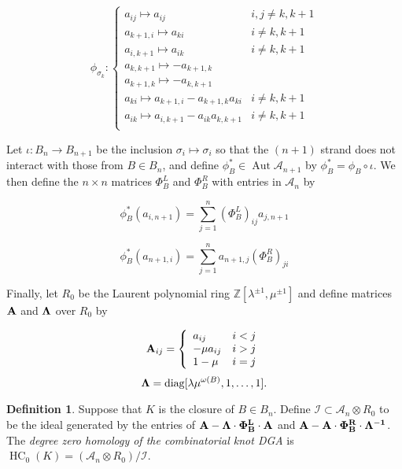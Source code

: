 \documentclass{amsart}[11pt,fullpage]
\def\Z{{\mathbb Z}}
\def\A{{\mathcal A}}
\def\s{{\sigma}}
\newcommand\Aut{\operatorname{Aut}}
\newcommand\diag{\operatorname{diag}}
\theoremstyle{definition}
\newtheorem{defn}[thm]{Definition}
\begin{document}
  \begin{equation}
  \phi_{\s_k}\colon
  \left\{
       \begin{array}{lr}
         a_{ij}\mapsto a_{ij} & i,j\ne k,k+1\\
         a_{k+1,i}\mapsto a_{ki} & i\ne k,k+1\\
         a_{i,k+1}\mapsto a_{ik} & i\ne k,k+1\\
         a_{k,k+1}\mapsto -a_{k+1,k} & \\
         a_{k+1,k}\mapsto -a_{k,k+1} & \\
         a_{ki}\mapsto a_{k+1,i} - a_{k+1,k}a_{ki} & i\ne k,k+1\\
         a_{ik}\mapsto a_{i,k+1} - a_{ik}a_{k,k+1} & i\ne k,k+1\\
       \end{array}
  \right.
  \label{DefnPhiMap}
  \end{equation}

  Let $\iota\colon B_n \rightarrow B_{n+1}$ be the inclusion $\s_i\mapsto\s_i$ so that the $(n+1)$ strand does not interact with those from $B\in B_n$, and define $\phi_B^*\in \Aut \A_{n+1}$ by $\phi_B^* = \phi_B\circ\iota$. We then define the $n\times n$ matrices $\Phi_B^L$ and $\Phi_B^R$ with entries in $\A_n$ by

  $$\phi_B^*(a_{i,n+1}) = \sum_{j=1}^n(\Phi_B^L)_{ij}a_{j,n+1}$$

  $$\phi_B^*(a_{n+1,i}) = \sum_{j=1}^na_{n+1,j}(\Phi_B^R)_{ji}$$

  Finally, let $R_0$ be the Laurent polynomial ring $\Z[\lambda^{\pm1},\mu^{\pm1}]$ and define matrices $\bf{A}$ and $\bf{\Lambda}$ over $R_0$ by

  \begin{equation}
  {\bf A}_{ij} = 
  \left\{
       \begin{array}{lr}
        a_{ij} & i<j\\
        -\mu a_{ij} & i>j\\
        1-\mu & i = j\\
       \end{array}
  \right.
  \label{def:Amatrix}
  \end{equation}
  \begin{equation}
  {\bf \Lambda} = \diag[\lambda\mu^{\omega(B)},1,\ldots,1].
  \label{defn:Lambda}
  \end{equation}

  \begin{defn}
  Suppose that $K$ is the closure of $B\in B_n$. Define $\mathcal{I}\subset \A_n\otimes R_0$ to be the ideal generated by the entries of $\bf{A} - \Lambda\cdot\Phi_B^L\cdot \bf{A}$ and $\bf{A} - \bf{A}\cdot\Phi_B^R\cdot\Lambda^{-1}$. The \emph{degree zero homology of the combinatorial knot DGA} is $\operatorname{HC}_0(K) = (\A_n\otimes R_0)/\mathcal{I}$.
  \label{defn:HC_0}
  \end{defn}
  
\end{document}
